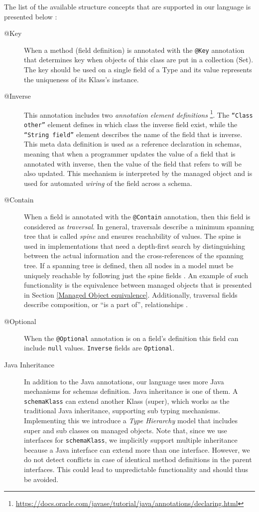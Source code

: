 The list of the available structure concepts that are supported in our language is presented below \cite{loh2012managed}:
\begin{description}
	\item [@Key] When a method (field definition) is annotated with the \texttt{@Key} annotation that determines key when objects of this class are put in a collection (Set).
	The key should be used on a single field of a Type and its value represents the uniqueness of its Klass's instance.

	\item [@Inverse] This annotation includes two \textit{annotation element definitions} \footnote{
		\url{https://docs.oracle.com/javase/tutorial/java/annotations/declaring.html}}.
	The \texttt{``Class other''} element defines in which class the inverse field exist, while the \texttt{``String field''} element describes the name of the field that is inverse.
	This meta data definition is used as a reference declaration in schemas, meaning that when a programmer updates the value of a field that is annotated with inverse, then the value of the field that refers to will be also updated.
	This mechanism is interpreted by the managed object and is used for automated \textit{wiring} of the field across a schema.

	\item [@Contain] When a field is annotated with the \texttt{@Contain} annotation, then this field is considered as \textit{traversal}. 
	In general, traversals describe a minimum spanning tree that is called \textit{spine} and ensures reachability of values.
	The spine is used in implementations that need a depth-first search by distinguishing between the actual information and the cross-references of the spanning tree.
	If a spanning tree is defined, then all nodes in a model must be uniquely reachable by following just the spine fields \cite{storm2012object}.
	An example of such functionality is the equivalence between managed objects that is presented in Section \ref{Managed Object equivalence}.
	Additionally, traversal fields describe composition, or ``is a part of'', relationships \cite{loh2012managed}.

	\item [@Optional] When the \texttt{@Optional} annotation is on a field's definition this field can include \texttt{null} values.
	\texttt{Inverse} fields are \texttt{Optional}. 

	\item [Java Inheritance] In addition to the Java annotations, our language uses more Java mechanisms for schemas definition. 
	Java inheritance is one of them. 
	A \texttt{schemaKlass} can extend another Klass (super), which works as the traditional Java inheritance, supporting sub typing mechanisms.
	Implementing this we introduce a \textit{Type Hierarchy} model that includes super and sub classes on managed objects.
	Note that, since we use interfaces for \texttt{schemaKlass}, we implicitly support multiple inheritance because a Java interface can extend more than one interface.
	However, we do not detect conflicts in case of identical method definitions in the parent interfaces.
	This could lead to unpredictable functionality and should thus be avoided.


\end{description}
